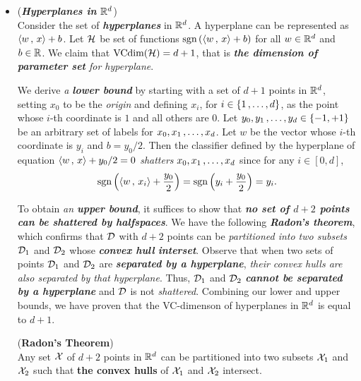 \documentclass[11pt]{article}
\begin{document}
\begin{itemize}
\item \begin{example}(\textbf{\emph{Hyperplanes in ${\mathbb R}^d$}})\\
Consider the set of \emph{\textbf{hyperplanes}} in ${\mathbb R}^d$. A hyperplane can be represented as $\left\langle w\,,\, x \right\rangle + b$. Let ${\mathcal H}$ be set of functions $\text{sgn}\left(\left\langle w\,,\, x \right\rangle + b\right)$ for all $w \in {\mathbb R}^d$ and $b \in {\mathbb R}$. We claim that \underline{$\text{VCdim}({\mathcal H}) = d + 1$}, that is \emph{\textbf{the dimension of parameter set} for hyperplane}.

We derive \emph{a \textbf{lower bound}} by starting with a set of $d + 1$ points in ${\mathbb R}^d$, setting $x_0$ to be the \emph{origin} and defining $x_i$, for $i \in \left\{1 \,{,}\ldots{,}\, d\right\}$, as the point whose $i$-th coordinate is $1$ and all others are $0$. Let $y_0, y_1 \,{,}\ldots{,}\, y_d \in \left\{-1,+1\right\}$ be an arbitrary set of labels for $x_0, x_1  \,{,}\ldots{,}\, x_d$. Let $w$ be the vector whose $i$-th coordinate is $y_i$ and $b = y_0/2$. Then the classifier defined by the hyperplane of equation $\left\langle w\,,\, x \right\rangle + y_0/2 = 0$ \emph{shatters}
$x_0, x_1  \,{,}\ldots{,}\, x_d$ since for any $i \in [0, d]$,
\begin{align*}
\text{sgn}\left(\left\langle w\,,\, x_i \right\rangle +  \frac{y_0}{2}\right) = \text{sgn}\left(y_i +  \frac{y_0}{2}\right) = y_i.
\end{align*}

To obtain \emph{an \textbf{upper bound}}, it suffices to show that \emph{\textbf{no set of $d + 2$ points can be shattered by halfspaces}}. We have the following \emph{\textbf{Radon's theorem}}, which confirms that ${\mathcal D}$ with $d+2$ points can be \emph{partitioned into two subsets} ${\mathcal D}_1$ and ${\mathcal D}_2$ whose \emph{\textbf{convex hull} \textbf{interset}}. Observe that when two sets of points ${\mathcal D}_1$ and ${\mathcal D}_2$ are \emph{\textbf{separated by a hyperplane}}, \emph{their convex hulls are also separated by that hyperplane}.  Thus,  ${\mathcal D}_1$ and ${\mathcal D}_2$  \emph{\textbf{cannot be separated by a hyperplane}} and ${\mathcal D}$ is not \emph{shattered}.  Combining our lower and upper bounds, we have proven that the VC-dimenson of hyperplanes in ${\mathbb R}^d$ is equal to $d+1$.

\begin{theorem} (\textbf{Radon's Theorem}) \citep{mohri2018foundations}\\
Any set ${\mathcal X}$ of $d+2$ points in ${\mathbb R}^d$ can be partitioned into two subsets ${\mathcal X}_1$ and ${\mathcal X}_2$ such that \textbf{the convex hulls} of ${\mathcal X}_1$ and ${\mathcal X}_2$ intersect.
\end{theorem}
\end{example}



\end{itemize}
\end{document}
